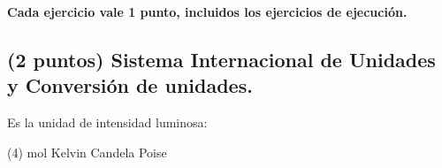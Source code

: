\documentclass[12pt, letter]{exam}
\begin{document}


\setcounter{page}{3}

\begin{center}
\textbf{Cada ejercicio vale 1 punto, incluidos los ejercicios de ejecución.}
\end{center}

\begin{questions}
    
    \section{(2 puntos) Sistema Internacional de Unidades y Conversión de unidades.}
    
    \question Es la unidad de intensidad luminosa:
    \begin{tasks}(4)
    \task mol
    \task Kelvin
    \task Candela
    \task Poise
    \end{tasks}



\end{questions}
\end{document}
